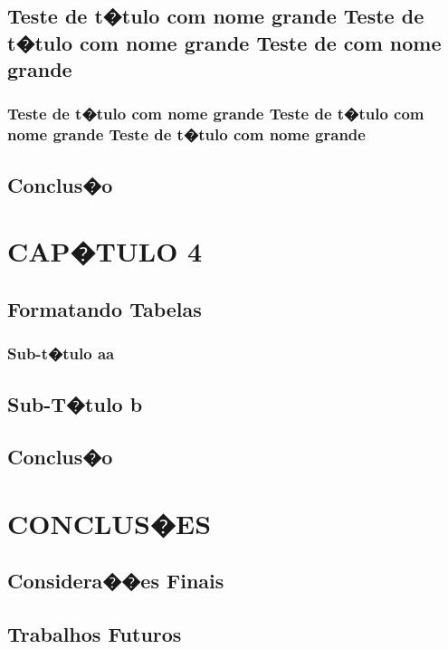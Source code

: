 \documentclass[pnumromarab, normaltoc, a4paper, 12pt]{abnt}
\begin{document}
\section{Teste de t�tulo com nome grande Teste de t�tulo com nome grande Teste
de com nome grande}
\subsection{Teste de t�tulo com nome grande Teste de t�tulo com nome grande
Teste de t�tulo com nome grande}
\section{Conclus�o}
\chapter{CAP�TULO 4}
\section{Formatando Tabelas}
\subsection{Sub-t�tulo aa}
\section{Sub-T�tulo b}
\section{Conclus�o}
\chapter{CONCLUS�ES}
\section{Considera��es Finais}
\section{Trabalhos Futuros}
\end{document}

